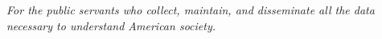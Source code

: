 

\copyrightpage

\begin{dedication}
	\emph{For the public servants who collect, maintain, and disseminate all the 
	data necessary to understand American society.}
\end{dedication}



\pagestyle{deposit}


\begin{acks}

\end{acks}

\renewcommand{\printtoctitle}[1]{\chapter*{#1}}
\renewcommand{\printloftitle}[1]{\chapter*{#1}}
\renewcommand{\printlottitle}[1]{\chapter*{#1}}

\renewcommand{\tocmark}{}
\renewcommand{\lofmark}{}
\renewcommand{\lotmark}{}

\renewcommand{\tocheadstart}{}
\renewcommand{\lofheadstart}{}
\renewcommand{\lotheadstart}{}

\renewcommand{\aftertoctitle}{}
\renewcommand{\afterloftitle}{}
\renewcommand{\afterlottitle}{}

\renewcommand{\cftchapterfont}{\normalfont} 
\renewcommand{\cftsectionfont}{\itshape} 
\renewcommand{\cftchapterpagefont}{\normalfont} 
\renewcommand{\cftchapterpresnum}{\bfseries} 
\renewcommand{\cftchapterleader}{\hfill} 
\renewcommand{\cftsectionleader}{\hfill} 
\renewcommand{\cftchapterafterpnum}{\cftparfillskip} 
\renewcommand{\cftsectionafterpnum}{\cftparfillskip} 

